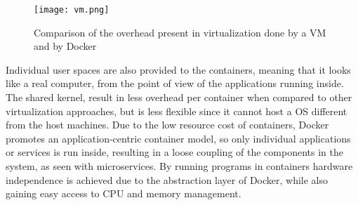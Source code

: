  \begin{figure}[ht]
    \myfloatalign
    \texttt{[image: vm.png]}
    \caption[Comparison of \acs{VM} and Docker]{Comparison of the overhead present in virtualization done by a \acl{VM} and by Docker}
    \label{fig:vm_vs_container}
\end{figure}
 
 Individual user spaces are also provided to the containers, meaning that it looks like a real computer, from the point of view of the applications running inside.
The shared kernel, result in less overhead per container when compared to other virtualization approaches, but is less flexible since it cannot host a \ac{OS} different from the host machines. Due to the low resource cost of containers, Docker promotes an application-centric container model\cite{merkel2014docker}, so only individual applications or services is run inside, resulting in a loose coupling of the components in the system, as seen with microservices. 
By running programs in containers hardware independence is achieved due to the abstraction layer of Docker, while also gaining easy access to CPU and memory management.

